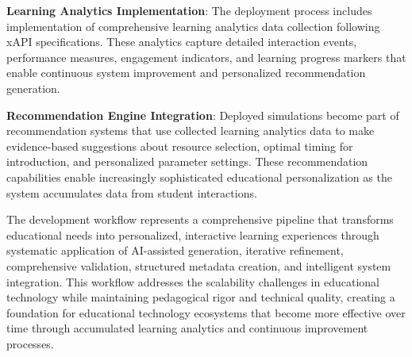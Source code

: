 \textbf{Learning Analytics Implementation}: The deployment process includes implementation of comprehensive learning analytics data collection following xAPI specifications. These analytics capture detailed interaction events, performance measures, engagement indicators, and learning progress markers that enable continuous system improvement and personalized recommendation generation.

\textbf{Recommendation Engine Integration}: Deployed simulations become part of recommendation systems that use collected learning analytics data to make evidence-based suggestions about resource selection, optimal timing for introduction, and personalized parameter settings. These recommendation capabilities enable increasingly sophisticated educational personalization as the system accumulates data from student interactions.

The development workflow represents a comprehensive pipeline that transforms educational needs into personalized, interactive learning experiences through systematic application of AI-assisted generation, iterative refinement, comprehensive validation, structured metadata creation, and intelligent system integration. This workflow addresses the scalability challenges in educational technology while maintaining pedagogical rigor and technical quality, creating a foundation for educational technology ecosystems that become more effective over time through accumulated learning analytics and continuous improvement processes.
